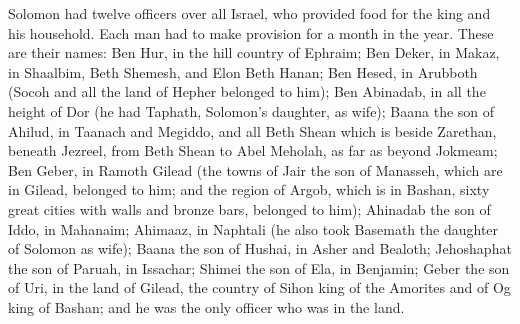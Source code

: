 \myverse{}Solomon had twelve officers over all Israel, who provided food
for the king and his household. Each man had to make provision for a month in the year.
\myverse{}These are their names: Ben Hur, in the hill country of Ephraim;
\myverse{}Ben Deker, in Makaz, in Shaalbim, Beth Shemesh, and Elon Beth Hanan;
\myverse{}Ben Hesed, in Arubboth (Socoh and all the land of Hepher belonged to him);
\myverse{}Ben Abinadab, in all the height of Dor (he had Taphath, Solomon’s daughter,
as wife);
\myverse{}Baana the son of Ahilud, in Taanach and Megiddo, and all Beth Shean which
is beside Zarethan, beneath Jezreel, from Beth Shean to Abel Meholah, as far as beyond Jokmeam;
\myverse{}Ben Geber, in Ramoth Gilead (the towns of Jair the son of Manasseh, which
are in Gilead, belonged to him; and the region of Argob, which is in Bashan, sixty great cities with walls
and bronze bars, belonged to him);
\myverse{}Ahinadab the son of Iddo, in Mahanaim;
\myverse{}Ahimaaz, in Naphtali (he also took Basemath the daughter of Solomon as wife);
\myverse{}Baana the son of Hushai, in Asher and Bealoth;
\myverse{}Jehoshaphat the son of Paruah, in Issachar;
\myverse{}Shimei the son of Ela, in Benjamin;
\myverse{}Geber the son of Uri, in the land of Gilead, the country of Sihon king of
the Amorites and of Og king of Bashan; and he was the only officer who was in the land.

